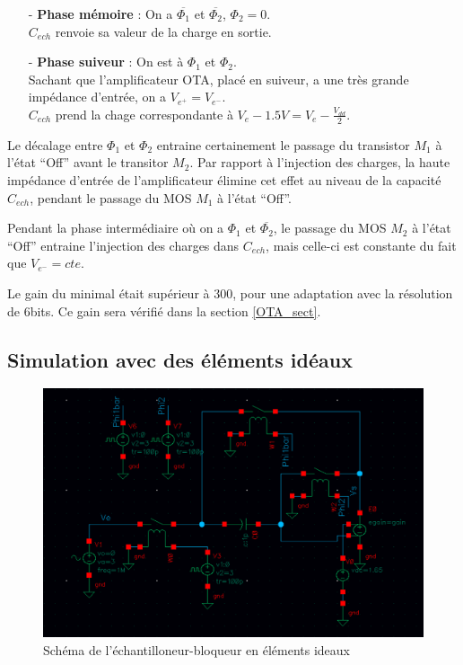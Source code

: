 \documentclass[11pt]{article}
\begin{document}
\begin{itemize}
  \item[-]\textbf{Phase m\'emoire} : On a $\overline{\Phi_1}$ et $\overline{\Phi_2}$, $\Phi_2 = 0$.\\
  $C_{ech}$ renvoie sa valeur de la charge en sortie.
  \item[-]\textbf{Phase suiveur} : On est \`a $\Phi_1$ et $\Phi_2$.\\
  Sachant que l'amplificateur OTA, plac\'e en suiveur, a une tr\`es grande imp\'edance d'entr\'ee, on a $V_{e^{+}} = V_{e^{-}}$.\\
  $C_{ech}$ prend la chage correspondante \`a $V_e - 1.5 V = V_e - \frac{V_{dd}}{2}$.
 \end{itemize}

Le d\'ecalage entre $\Phi_1$ et $\Phi_2$ entraine certainement le passage du transistor $M_1$ \`a l'\'etat ``Off'' avant le transitor
$M_2$. Par rapport \`a l'injection des charges, la haute imp\'edance d'entr\'ee de l'amplificateur \'elimine cet effet au niveau
de la capacit\'e $C_{ech}$, pendant le passage du MOS $M_1$ \`a l'\'etat ``Off''.

Pendant la phase interm\'ediaire o\`u on a $\Phi_1$ et $\overline{\Phi_2}$, le passage du MOS $M_2$ \`a l'\'etat ``Off'' entraine
l'injection des charges dans $C_{ech}$, mais celle-ci est constante du fait que $V_{e^{-}} = cte$.

Le gain du minimal \'etait sup\'erieur \`a 300, pour une adaptation avec la r\'esolution de 6bits. Ce gain sera v\'erifi\'e
dans la section \ref{OTA_sect}.

\subsection{Simulation avec des \'el\'ements id\'eaux}

\begin{figure}[!htb]
\begin{center}
  \includegraphics[scale=0.30]{Echantillonneur-bloqueur_ideal.png}
  \caption{Sch\'ema de l'\'echantilloneur-bloqueur en \'el\'ements ideaux}
\end{center}
\end{figure}
\end{document}

